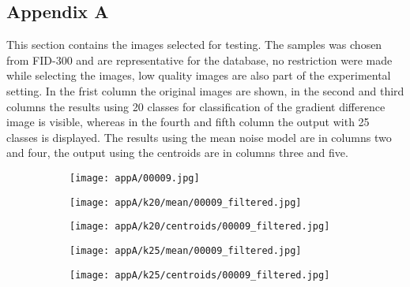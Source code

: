 \documentclass[draft,final]{vutinfth} %
\begin{document}
\begin{appendices}
		\chapter{Appendix A}
		\label{AppA}
		This section contains the images selected for testing.
		The samples was chosen from FID-300 and are representative for the database, no restriction were made while selecting the images, low quality images are also part of the experimental setting.
		In the frist column the original images are shown, in the second and third columns the results using 20 classes for classification of the gradient difference image is visible, whereas in the fourth and fifth column the output with 25 classes is displayed.
		The results using the mean noise model are in columns two and four, the output using the centroids are in columns three and five.
\begin{figure}[h]
\centering
  \begin{subfigure}[b]{0.19\columnwidth}
    \centering
    \texttt{[image: appA/00009.jpg]}
  \end{subfigure}
  \begin{subfigure}[b]{0.19\columnwidth}
    \centering
    \texttt{[image: appA/k20/mean/00009\_filtered.jpg]}
  \end{subfigure}
  \begin{subfigure}[b]{0.19\columnwidth}
    \centering
    \texttt{[image: appA/k20/centroids/00009\_filtered.jpg]}
  \end{subfigure}
  \begin{subfigure}[b]{0.19\columnwidth}
    \centering
    \texttt{[image: appA/k25/mean/00009\_filtered.jpg]}
  \end{subfigure}
  \begin{subfigure}[b]{0.19\columnwidth}
    \centering
    \texttt{[image: appA/k25/centroids/00009\_filtered.jpg]}
  \end{subfigure}
\caption{}
\end{figure}  


\end{appendices}
\end{document}
